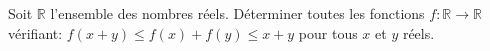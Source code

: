 \documentclass[varwidth]{standalone}
\begin{document}
    Soit $\mathbb{R}$ l'ensemble des nombres r\'eels. D\'eterminer toutes les fonctions $f: \mathbb{R} \to \mathbb{R}$ v\'erifiant: $f(x + y) \leq f(x) + f(y) \leq x + y$ pour tous $x$ et $y$ r\'eels.
\end{document}
